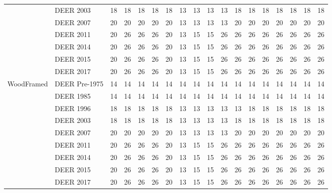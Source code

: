 \begin{table}
\begin{tabular}{p{0.4in}p{0.7in}p{0.1in}p{0.1in}p{0.1in}p{0.1in}p{0.1in}p{0.1in}p{0.1in}p{0.1in}p{0.1in}p{0.1in}p{0.1in}p{0.1in}p{0.1in}p{0.1in}p{0.1in}p{0.1in}}
         & DEER 2003     & 18 & 18 & 18 & 18 & 18 & 13 & 13 & 13 & 13 & 18 & 18 & 18 & 18 & 18 & 18 & 18 \\
         & DEER 2007     & 20 & 20 & 20 & 20 & 20 & 13 & 13 & 13 & 13 & 20 & 20 & 20 & 20 & 20 & 20 & 20 \\
         & DEER 2011     & 20 & 26 & 26 & 26 & 20 & 13 & 15 & 15 & 26 & 26 & 26 & 26 & 26 & 26 & 26 & 26 \\
         & DEER 2014     & 20 & 26 & 26 & 26 & 20 & 13 & 15 & 15 & 26 & 26 & 26 & 26 & 26 & 26 & 26 & 26 \\
         & DEER 2015     & 20 & 26 & 26 & 26 & 20 & 13 & 15 & 15 & 26 & 26 & 26 & 26 & 26 & 26 & 26 & 26 \\
         & DEER 2017     & 20 & 26 & 26 & 26 & 20 & 13 & 15 & 15 & 26 & 26 & 26 & 26 & 26 & 26 & 26 & 26 \\
WoodFramed & DEER Pre-1975 & 14 & 14 & 14 & 14 & 14 & 14 & 14 & 14 & 14 & 14 & 14 & 14 & 14 & 14 & 14 & 14 \\
         & DEER 1985     & 14 & 14 & 14 & 14 & 14 & 14 & 14 & 14 & 14 & 14 & 14 & 14 & 14 & 14 & 14 & 14 \\
         & DEER 1996     & 18 & 18 & 18 & 18 & 18 & 13 & 13 & 13 & 13 & 13 & 18 & 18 & 18 & 18 & 18 & 18 \\
         & DEER 2003     & 18 & 18 & 18 & 18 & 18 & 13 & 13 & 13 & 13 & 18 & 18 & 18 & 18 & 18 & 18 & 18 \\
         & DEER 2007     & 20 & 20 & 20 & 20 & 20 & 13 & 13 & 13 & 13 & 20 & 20 & 20 & 20 & 20 & 20 & 20 \\
         & DEER 2011     & 20 & 26 & 26 & 26 & 20 & 13 & 15 & 15 & 26 & 26 & 26 & 26 & 26 & 26 & 26 & 26 \\
         & DEER 2014     & 20 & 26 & 26 & 26 & 20 & 13 & 15 & 15 & 26 & 26 & 26 & 26 & 26 & 26 & 26 & 26 \\
         & DEER 2015     & 20 & 26 & 26 & 26 & 20 & 13 & 15 & 15 & 26 & 26 & 26 & 26 & 26 & 26 & 26 & 26 \\
         & DEER 2017     & 20 & 26 & 26 & 26 & 20 & 13 & 15 & 15 & 26 & 26 & 26 & 26 & 26 & 26 & 26 & 26
\end{tabular}
\end{table}